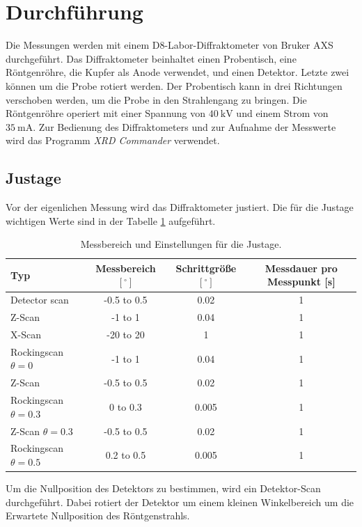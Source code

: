 \section{Durchführung}
\label{sec:Durchführung}
Die Messungen werden mit einem D8-Labor-Diffraktometer von Bruker AXS durchgeführt. 
Das Diffraktometer beinhaltet einen Probentisch, eine Röntgenröhre, die Kupfer als Anode verwendet, und einen Detektor.
Letzte zwei können um die Probe rotiert werden. 
Der Probentisch kann in drei Richtungen verschoben werden, um die Probe in den Strahlengang zu bringen.
Die Röntgenröhre operiert mit einer Spannung von $\SI{40}{\kilo\volt}$ und einem Strom von $\SI{35}{\milli\ampere}$.
Zur Bedienung des Diffraktometers und zur Aufnahme der Messwerte wird das Programm \textit{XRD Commander} verwendet.

\subsection{Justage}
\label{subsec:Justage}
Vor der eigenlichen Messung wird das Diffraktometer justiert.
Die für die Justage wichtigen Werte sind in der Tabelle \ref{tab:Justage} aufgeführt.
\begin{table}[h!]
    \centering
    \label{tab:Justage}
    \begin{tabular}{lccc}
        \toprule
        \textbf{Typ} & \textbf{Messbereich $[^\circ]$} & \textbf{Schrittgröße $[^\circ]$} & \textbf{Messdauer pro Messpunkt [s]} \\
        \midrule
        Detector scan & -0.5 to 0.5 & 0.02 & 1 \\
        Z-Scan & -1 to 1 & 0.04 & 1 \\
        X-Scan & -20 to 20 & 1 & 1 \\
        Rockingscan $\theta = 0$ & -1 to 1 & 0.04 & 1 \\
        Z-Scan & -0.5 to 0.5 & 0.02 & 1 \\
        Rockingscan $\theta = 0.3$ & 0 to 0.3 & 0.005 & 1 \\
        Z-Scan $\theta = 0.3$ & -0.5 to 0.5 & 0.02 & 1 \\
        Rockingscan $\theta = 0.5$ & 0.2 to 0.5 & 0.005 & 1 \\
        \bottomrule
    \end{tabular}
    \caption{Messbereich und Einstellungen für die Justage.}
\end{table}
Um die Nullposition des Detektors zu bestimmen, wird ein Detektor-Scan durchgeführt.
Dabei rotiert der Detektor um einem kleinen Winkelbereich um die Erwartete Nullposition des Röntgenstrahls.
